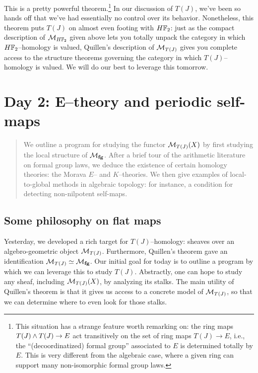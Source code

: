 This is a pretty powerful theorem.\footnote{This situation has a strange feature worth remarking on: the ring maps $T(J) \wedge T(J) \to E$ act transitively on the set of ring maps $T(J) \to E$, i.e., the ``(decoordinatized) formal group'' associated to $E$ is determined totally by $E$.  This is very different from the algebraic case, where a given ring can support many non-isomorphic formal group laws.}  In our discussion of $T(J)$, we've been so hands off that we've had essentially no control over its behavior.  Nonetheless, this theorem puts $T(J)$ on almost even footing with $H\mathbb F_2$: just as the compact description of $\mathcal{M}_{H\mathbb F_2}$ given above lets you totally unpack the category in which $H\mathbb F_2$--homology is valued, Quillen's description of $\mathcal{M}_{T(J)}$ gives you complete access to the structure theorems governing the category in which $T(J)$--homology is valued.  We will do our best to leverage this tomorrow.













\newpage
\section{Day 2: E--theory and periodic self-maps}

\begin{abstract}
We outline a program for studying the functor $\mathcal{M}_{T(J)}(X)$ by first studying the local structure of $\mathcal{M}_{\mathbf{fg}}$.  After a brief tour of the arithmetic literature on formal group laws, we deduce the existence of certain homology theories: the Morava $E$-- and $K$--theories.  We then give examples of local-to-global methods in algebraic topology: for instance, a condition for detecting non-nilpotent self-maps.
\end{abstract}


\subsection{Some philosophy on flat maps}

Yesterday, we developed a rich target for $T(J)$--homology: sheaves over an algebro-geometric object $\mathcal{M}_{T(J)}$.  Furthermore, Quillen's theorem gave an identification $\mathcal{M}_{T(J)} \simeq \mathcal{M}_{\mathbf{fg}}$.  Our initial goal for today is to outline a program by which we can leverage this to study $T(J)$.  Abstractly, one can hope to study any sheaf, including $\mathcal{M}_{T(J)}(X)$, by analyzing its stalks.  The main utility of Quillen's theorem is that it gives us access to a concrete model of $\mathcal{M}_{T(J)}$, so that we can determine where to even look for those stalks.

